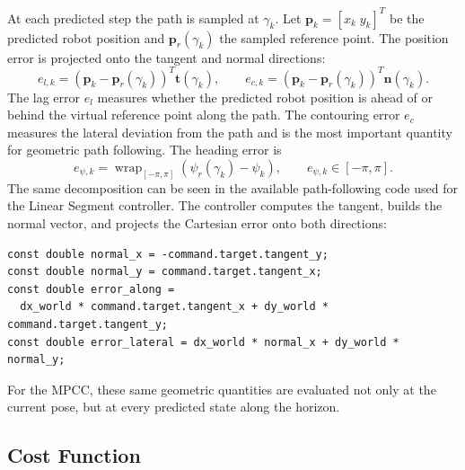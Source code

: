 At each predicted step the path is sampled at \(\gamma_k\).  Let
\(\mathbf{p}_k=[x_k\;y_k]^T\) be the predicted robot position and
\(\mathbf{p}_r(\gamma_k)\) the sampled reference point.  The position error is
projected onto the tangent and normal directions:
\begin{equation}
    e_{l,k} =
    \left(\mathbf{p}_k-\mathbf{p}_r(\gamma_k)\right)^T
    \mathbf{t}(\gamma_k),
    \qquad
    e_{c,k} =
    \left(\mathbf{p}_k-\mathbf{p}_r(\gamma_k)\right)^T
    \mathbf{n}(\gamma_k).
\end{equation}
The lag error \(e_l\) measures whether the predicted robot position is ahead of
or behind the virtual reference point along the path.  The contouring error
\(e_c\) measures the lateral deviation from the path and is the most important
quantity for geometric path following.  The heading error is
\begin{equation}
    e_{\psi,k}
    =
    \operatorname{wrap}_{[-\pi,\pi]}
    \!\left(\psi_r(\gamma_k)-\psi_k\right),
    \qquad
    e_{\psi,k}\in[-\pi,\pi].
\end{equation}
The same decomposition can be seen in the available path-following code used for
the Linear Segment controller.  The controller computes the tangent, builds the
normal vector, and projects the Cartesian error onto both directions:

\begin{verbatim}
const double normal_x = -command.target.tangent_y;
const double normal_y = command.target.tangent_x;
const double error_along =
  dx_world * command.target.tangent_x + dy_world * command.target.tangent_y;
const double error_lateral = dx_world * normal_x + dy_world * normal_y;
\end{verbatim}

For the MPCC, these same geometric quantities are evaluated not only at the
current pose, but at every predicted state along the horizon.

\subsection{Cost Function}

